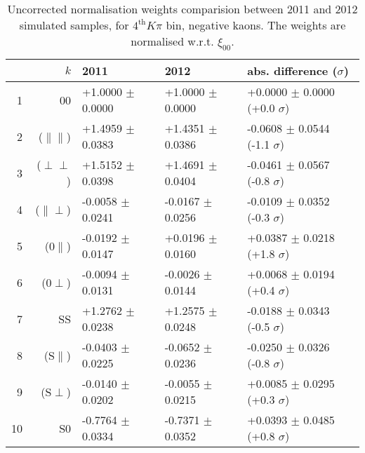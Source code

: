 \begin{table}[hbtp]
  \caption{\small Uncorrected normalisation weights comparision between 2011 and 2012 simulated samples, for $4^{\text{th}}K\pi$ bin, negative kaons. The weights are normalised w.r.t. $\xi_{00}$.}
  \center\footnotesize
  \begin{tabular}{r r l l l}      
   \multicolumn{2}{r}{$k$}     & 2011             & 2012              &   abs. difference ($\sigma$)        \\
   \hline 
  1  &   00                   & +1.0000 $\pm$  0.0000  &  +1.0000 $\pm$  0.0000  &  +0.0000 $\pm$  0.0000 (+0.0 $\sigma$) \\
  2  &   ($\parallel\parallel$) & +1.4959 $\pm$  0.0383  &  +1.4351 $\pm$  0.0386  &  -0.0608 $\pm$  0.0544 (-1.1 $\sigma$) \\
  3  &   ($\perp\perp$)       & +1.5152 $\pm$  0.0398  &  +1.4691 $\pm$  0.0404  &  -0.0461 $\pm$  0.0567 (-0.8 $\sigma$) \\
  4  &   ($\parallel\perp$)   & -0.0058 $\pm$  0.0241  &  -0.0167 $\pm$  0.0256  &  -0.0109 $\pm$  0.0352 (-0.3 $\sigma$) \\
  5  &   ($0\parallel$)       & -0.0192 $\pm$  0.0147  &  +0.0196 $\pm$  0.0160  &  +0.0387 $\pm$  0.0218 (+1.8 $\sigma$) \\
  6  &   ($0\perp$)           & -0.0094 $\pm$  0.0131  &  -0.0026 $\pm$  0.0144  &  +0.0068 $\pm$  0.0194 (+0.4 $\sigma$) \\
  7  &   SS                   & +1.2762 $\pm$  0.0238  &  +1.2575 $\pm$  0.0248  &  -0.0188 $\pm$  0.0343 (-0.5 $\sigma$) \\
  8  &   (S$\parallel$)       & -0.0403 $\pm$  0.0225  &  -0.0652 $\pm$  0.0236  &  -0.0250 $\pm$  0.0326 (-0.8 $\sigma$) \\
  9  &   (S$\perp$)           & -0.0140 $\pm$  0.0202  &  -0.0055 $\pm$  0.0215  &  +0.0085 $\pm$  0.0295 (+0.3 $\sigma$) \\
  10 &    S0                   & -0.7764 $\pm$  0.0334  &  -0.7371 $\pm$  0.0352  &  +0.0393 $\pm$  0.0485 (+0.8 $\sigma$) \\
\hline
\end{tabular}
\end{table}
